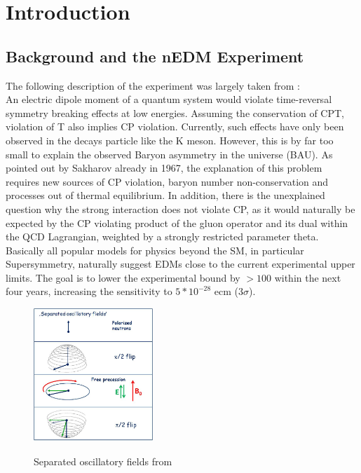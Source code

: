 \chapter{Introduction}

\section{Background and the nEDM Experiment}
The following description of the experiment was largely taken from \cite{EDMReport2, EDMReport, Schneider12}:\\
An electric dipole moment of a quantum system would violate time-reversal symmetry breaking effects at low energies. Assuming the conservation of CPT, violation of T also implies CP violation. Currently, such effects have only been observed in the decays particle like the K meson. However, this is by far too small to explain the observed Baryon asymmetry in the universe (BAU). As pointed out by Sakharov already in 1967, the explanation of this problem requires new sources of CP violation, baryon number non-conservation and processes out of thermal equilibrium. In addition, there is the unexplained question why the strong interaction does not violate CP, as it would naturally be expected by the CP violating product of the gluon operator and its dual within the QCD Lagrangian, weighted by a strongly restricted parameter theta. \\

Basically all popular models for physics beyond the SM, in particular Supersymmetry, naturally suggest EDMs close to the current experimental upper limits. The goal is to lower the experimental bound by  $> 100$ within the next four years, increasing the sensitivity to $ 5*10^{-28} $ ecm (3$\sigma$). \\

\begin{figure}[h!]
	\centering
	{\includegraphics[width=0.4\textwidth]{images/ramsey.png}}
	\caption{Separated oscillatory fields from \cite{EDMReport}}
\end{figure}

